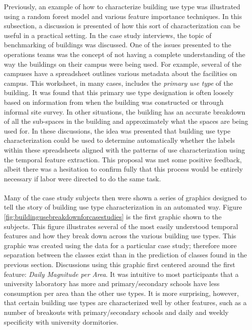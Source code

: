 Previously, an example of how to characterize building use type was illustrated using a random forest model and various feature importance techniques. In this subsection, a discussion is presented of how this sort of characterization can be useful in a practical setting. In the case study interviews, the topic of benchmarking of buildings was discussed. One of the issues presented to the operations teams was the concept of not having a complete understanding of the way the buildings on their campus were being used. For example, several of the campuses have a spreadsheet outlines various metadata about the facilities on campus. This worksheet, in many cases, includes the \emph{primary use type} of the building. It was found that this primary use type designation is often loosely based on information from when the building was constructed or through informal site survey. In other situations, the building has an accurate breakdown of all the sub-spaces in the building and approximately what the spaces are being used for. In these discussions, the idea was presented that building use type characterization could be used to determine automatically whether the labels within these spreadsheets aligned with the patterns of use characterization using the temporal feature extraction. This proposal was met some positive feedback, albeit there was a hesitation to confirm fully that this process would be entirely necessary if labor were directed to do the same task.\\
\\
Many of the case study subjects then were shown a series of graphics designed to tell the story of building use type characterization in an automated way. Figure \ref{fig:buildingusebreakdownforcasestudies} is the first graphic shown to the subjects. This figure illustrates several of the most easily understood temporal features and how they break down across the various building use types. This graphic was created using the data for a particular case study; therefore more separation between the classes exist than in the prediction of classes found in the previous section. Discussions using this graphic first centered around the first feature: \emph{Daily Magnitude per Area}. It was intuitive to most participants that a university laboratory has more and primary/secondary schools have less consumption per area than the other use types. It is more surprising, however, that certain building use types are characterized well by other features, such as a number of breakouts with primary/secondary schools and daily and weekly specificity with university dormitories.

